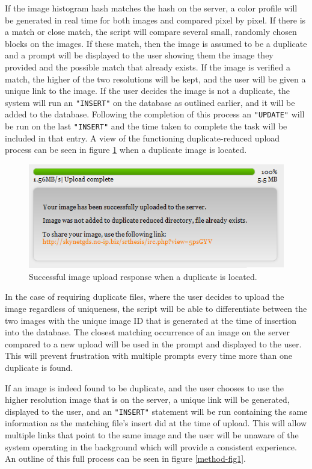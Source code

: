 If the image histogram hash matches the hash on the server, a color profile will be generated in real time for both images and compared pixel by pixel. If there is a match or close match, the script will compare several small, randomly chosen blocks on the images. If these match, then the image is assumed to be a duplicate and a prompt will be displayed to the user showing them the image they provided and the possible match that already exists. If the image is verified a match, the higher of the two resolutions will be kept, and the user will be given a unique link to the image. If the user decides the image is not a duplicate, the system will run an {\tt "INSERT"} on the database as outlined earlier, and it will be added to the database. Following the completion of this process an {\tt "UPDATE"} will be run on the last {\tt "INSERT"} and the time taken to complete the task will be included in that entry. A view of the functioning duplicate-reduced upload process can be seen in figure \ref{success_dupfound} when a duplicate image is located.

\begin{figure}[htbp]
\centering
\includegraphics[width=5in]{success_dupfound}
\caption{Successful image upload response when a duplicate is located.}
\label{success_dupfound}
\end{figure}

In the case of requiring duplicate files, where the user decides to upload the image regardless of uniqueness, the script will be able to differentiate between the two images with the unique image ID that is generated at the time of insertion into the database. The closest matching occurrence of an image on the server compared to a new upload will be used in the prompt and displayed to the user. This will prevent frustration with multiple prompts every time more than one duplicate is found.

If an image is indeed found to be duplicate, and the user chooses to use the higher resolution image that is on the server, a unique link will be generated, displayed to the user, and an {\tt "INSERT"} statement will be run containing the same information as the matching file's insert did at the time of upload. This will allow multiple links that point to the same image and the user will be unaware of the system operating in the background which will provide a consistent experience. An outline of this full process can be seen in figure \ref{method-fig1}.


